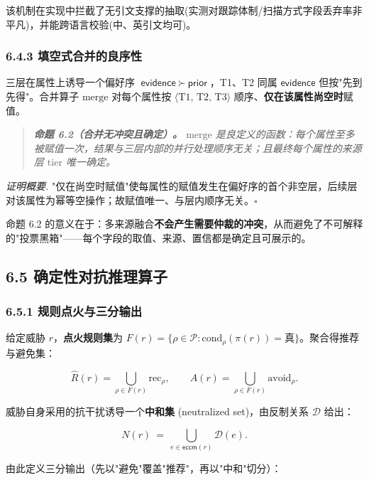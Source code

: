\documentclass[12pt,a4paper]{ctexart}
\begin{document}
该机制在实现中拦截了无引文支撑的抽取(实测对跟踪体制/扫描方式字段丢弃率非平凡)，并能跨语言校验(中、英引文均可)。

\subsubsection*{6.4.3 填空式合并的良序性}

三层在属性上诱导一个偏好序 $\textsf{evidence}\ \succ\ \textsf{prior}$，T1、T2 同属 $\textsf{evidence}$ 但按"先到先得"。合并算子 $\mathrm{merge}$ 对每个属性按 $\langle\text{T1, T2, T3}\rangle$ 顺序、\textbf{仅在该属性尚空时}赋值。

\begin{quote}\itshape \textbf{命题 6.2（合并无冲突且确定）。} $\mathrm{merge}$ 是良定义的函数：每个属性至多被赋值一次，结果与三层内部的并行处理顺序无关；且最终每个属性的来源层 $\mathrm{tier}$ 唯一确定。\end{quote}

\textit{证明概要.} "仅在尚空时赋值"使每属性的赋值发生在偏好序的首个非空层，后续层对该属性为幂等空操作；故赋值唯一、与层内顺序无关。$\square$

命题 6.2 的意义在于：多来源融合\textbf{不会产生需要仲裁的冲突}，从而避免了不可解释的"投票黑箱"——每个字段的取值、来源、置信都是确定且可展示的。


\subsection*{6.5 确定性对抗推理算子}

\subsubsection*{6.5.1 规则点火与三分输出}

给定威胁 $r$，\textbf{点火规则集}为 $F(r)=\{\rho\in\mathcal{P}:\mathrm{cond}_\rho(\pi(r))=\text{真}\}$。聚合得推荐与避免集：

\[\widehat{R}(r)=\bigcup_{\rho\in F(r)}\mathrm{rec}_\rho,\qquad A(r)=\bigcup_{\rho\in F(r)}\mathrm{avoid}_\rho .\]

威胁自身采用的抗干扰诱导一个\textbf{中和集} (neutralized set)，由反制关系 $\mathcal{D}$ 给出：

\[N(r)\ =\ \bigcup_{e\in\mathsf{eccm}(r)}\mathcal{D}(e).\]

由此定义三分输出（先以"避免"覆盖"推荐"，再以"中和"切分）：
\end{document}
